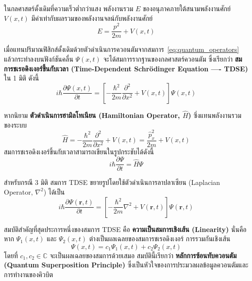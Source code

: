 ในกลศาสตร์ดั้งเดิมที่ความเร็วต่ำกว่าแสง พลังงานรวม $E$ ของอนุภาคภายใต้สนามพลังงานศักย์ $V(x, t)$ มีค่าเท่ากับผลรวมของพลังงานจลน์กับพลังงานศักย์
\begin{equation}
E = \frac{p^2}{2m} + V(x, t)
\label{eq:classical_hamiltonian}
\end{equation}

เมื่อแทนปริมาณฟิสิกส์ดั้งเดิมด้วยตัวดำเนินการควอนตัมจากสมการ~\eqref{eq:quantum_operators} แล้วกระทำลงบนฟังก์ชันคลื่น $\Psi(x, t)$ จะได้สมการรากฐานของกลศาสตร์ควอนตัม ซึ่งเรียกว่า \textbf{สมการชเรอดิงเงอร์ขึ้นกับเวลา (Time-Dependent Schrödinger Equation ---- TDSE)} ใน 1 มิติ ดังนี้
\begin{equation}
i\hbar \frac{\partial \Psi(x, t)}{\partial t} = \left[ -\frac{\hbar^2}{2m} \frac{\partial^2}{\partial x^2} + V(x, t) \right] \Psi(x, t)
\label{eq:tdse_1d}
\end{equation}

หากนิยาม \textbf{ตัวดำเนินการฮามิลโทเนียน (Hamiltonian Operator, $\hat{H}$)} ซึ่งแทนพลังงานรวมของระบบ
\begin{equation}
\hat{H} = -\frac{\hbar^2}{2m} \frac{\partial^2}{\partial x^2} + V(x, t) = \frac{\hat{p}_x^2}{2m} + V(x, t)
\label{eq:hamiltonian_def}
\end{equation}
สมการชเรอดิงเงอร์ขึ้นกับเวลาสามารถเขียนในรูปกระชับได้ดังนี้
\begin{equation}
i\hbar \frac{\partial \Psi}{\partial t} = \hat{H}\Psi
\label{eq:tdse_compact}
\end{equation}

สำหรับกรณี 3 มิติ สมการ TDSE ขยายรูปโดยใช้ตัวดำเนินการลาปลาเซียน (Laplacian Operator, $\nabla^2$) ได้เป็น
\begin{equation}
i\hbar \frac{\partial \Psi(\mathbf{r}, t)}{\partial t} = \left[ -\frac{\hbar^2}{2m} \nabla^2 + V(\mathbf{r}, t) \right] \Psi(\mathbf{r}, t)
\label{eq:tdse_3d}
\end{equation}

สมบัติสำคัญที่สุดประการหนึ่งของสมการ TDSE คือ \textbf{ความเป็นสมการเชิงเส้น (Linearity)} นั่นคือ หาก $\Psi_1(x, t)$ และ $\Psi_2(x, t)$ ต่างเป็นผลเฉลยของสมการชเรอดิงเงอร์ การรวมกันเชิงเส้น
\begin{equation}
\Psi(x, t) = c_1 \Psi_1(x, t) + c_2 \Psi_2(x, t)
\label{eq:superposition}
\end{equation}
โดยที่ $c_1, c_2 \in \mathbb{C}$ จะเป็นผลเฉลยของสมการด้วยเสมอ สมบัตินี้เรียกว่า \textbf{หลักการซ้อนทับควอนตัม (Quantum Superposition Principle)} ซึ่งเป็นหัวใจของการประมวลผลข้อมูลควอนตัมและการทำงานของคิวบิต

